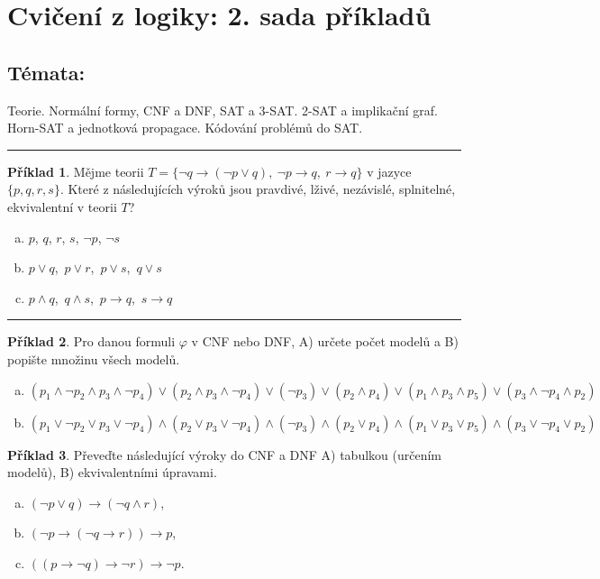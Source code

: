 \documentclass{amsart}
\theoremstyle{definition}
\newtheorem{problem}{Příklad}
\begin{document}
\section*{Cvičení z logiky: 2. sada příkladů}

\bigskip\bigskip\bigskip

\subsection*{Témata:} 

Teorie. Normální formy, CNF a DNF, SAT a 3-SAT. 2-SAT a implikační graf. Horn-SAT a jednotková propagace. Kódování problémů do SAT.


\bigskip

\hrule

\bigskip\begin{problem}
Mějme teorii $T=\{\neg q \to (\neg p \vee q),\ \neg p \to q,\ r \to q\}$ v jazyce $\{p, q, r, s\}$. Které z následujících výroků jsou pravdivé, lživé, nezávislé, splnitelné, ekvivalentní v teorii $T$?
\begin{enumerate}[(a)]
\item $p$, $q$, $r$, $s$, $\neg p$, $\neg s$
\item $p \vee q$,\ $p \vee r$,\ $p \vee s$,\ $q \vee s$
\item $p \wedge q$,\ $q \wedge s$,\ $p \to q$,\ $s \to q$
\end{enumerate}
\end{problem}

\hrule

\bigskip\begin{problem} Pro danou formuli $\varphi$ v CNF nebo DNF, A) určete počet modelů a B) popište množinu všech modelů.
\begin{enumerate}[a)]
\item $(p_1 \wedge  \neg p_2 \wedge  p_3 \wedge  \neg p_4 )\vee(p_2 \wedge  p_3 \wedge  \neg p_4 )\vee(\neg p_3)\vee(p_2 \wedge  p_4)\vee(p_1 \wedge  p_3 \wedge  p_5 )\vee(p_3 \wedge  \neg p_4 \wedge  p_2 )$
\item $(p_1 \vee \neg p_2 \vee p_3 \vee \neg p_4 )\wedge(p_2 \vee p_3 \vee \neg p_4 )\wedge(\neg p_3)\wedge(p_2 \vee p_4)\wedge(p_1 \vee p_3 \vee p_5 )\wedge(p_3 \vee \neg p_4 \vee p_2 )$
\end{enumerate}
\end{problem}






\bigskip\begin{problem} Převeďte následující výroky do CNF a DNF A) tabulkou (určením modelů), B) ekvivalentními
úpravami.
\begin{enumerate}[a)]
    \item $(\neg p \vee q)\to (\neg q \wedge r)$,
    \item $(\neg p \to (\neg q \to r))\to p$,
    \item $((p\to \neg q) \to \neg r) \to \neg p$.

\end{enumerate}
\end{problem}
\end{document}
